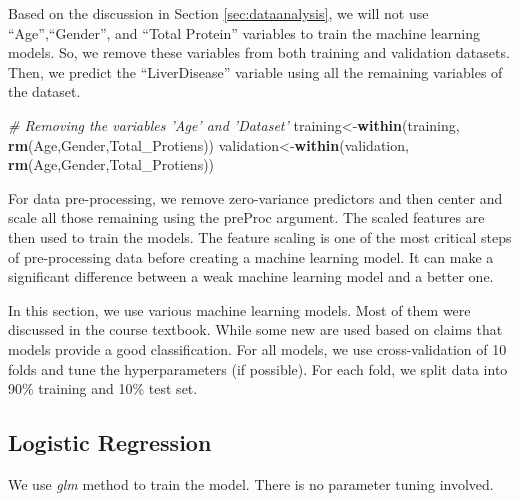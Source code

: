 \documentclass[]{article}
\newenvironment{Shaded}{\begin{snugshade}}{\end{snugshade}}
\newcommand{\CommentTok}[1]{\textcolor[rgb]{0.56,0.35,0.01}{\textit{#1}}}
\newcommand{\KeywordTok}[1]{\textcolor[rgb]{0.13,0.29,0.53}{\textbf{#1}}}
\newcommand{\NormalTok}[1]{#1}
\begin{document}
Based on the discussion in Section \ref{sec:dataanalysis}, we will not
use ``Age'',``Gender'', and ``Total Protein'' variables to train the
machine learning models. So, we remove these variables from both
training and validation datasets. Then, we predict the ``LiverDisease''
variable using all the remaining variables of the dataset.

\begin{Shaded}
\begin{Highlighting}[]
\CommentTok{# Removing the variables 'Age' and 'Dataset' }
\NormalTok{training<-}\KeywordTok{within}\NormalTok{(training, }\KeywordTok{rm}\NormalTok{(Age,Gender,Total_Protiens))}
\NormalTok{validation<-}\KeywordTok{within}\NormalTok{(validation, }\KeywordTok{rm}\NormalTok{(Age,Gender,Total_Protiens))}
\end{Highlighting}
\end{Shaded}

For data pre-processing, we remove zero-variance predictors and then
center and scale all those remaining using the preProc argument. The
scaled features are then used to train the models. The feature scaling
is one of the most critical steps of pre-processing data before creating
a machine learning model. It can make a significant difference between a
weak machine learning model and a better one.

In this section, we use various machine learning models. Most of them
were discussed in the course textbook. While some new are used based on
claims that models provide a good classification. For all models, we use
cross-validation of 10 folds and tune the hyperparameters (if possible).
For each fold, we split data into 90\% training and 10\% test set.

\subsection{Logistic Regression}

We use \emph{glm} method to train the model. There is no parameter
tuning involved.
\end{document}
